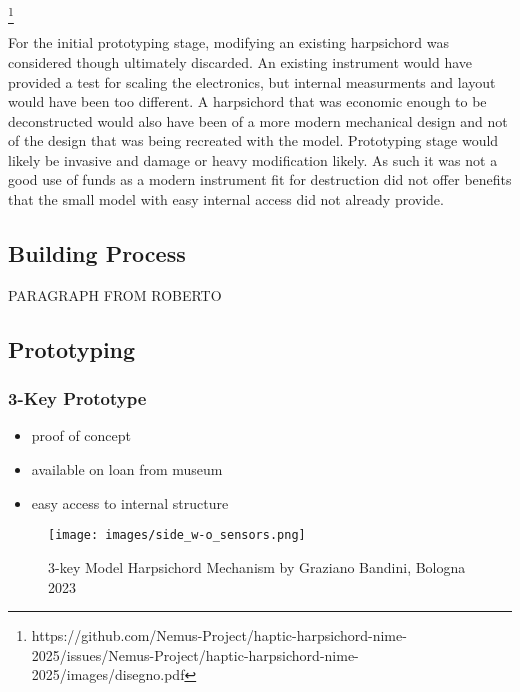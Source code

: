 \footnote{https://github.com/Nemus-Project/haptic-harpsichord-nime-2025/issues/Nemus-Project/haptic-harpsichord-nime-2025/images/disegno.pdf}

For the initial prototyping stage, modifying an existing harpsichord was
considered though ultimately discarded. An existing instrument would
have provided a test for scaling the electronics, but internal
measurments and layout would have been too different. A harpsichord that
was economic enough to be deconstructed would also have been of a more
modern mechanical design and not of the design that was being recreated
with the model. Prototyping stage would likely be invasive and damage or
heavy modification likely. As such it was not a good use of funds as a
modern instrument fit for destruction did not offer benefits that the
small model with easy internal access did not already provide.

\subsection{Building Process}\label{building-process}

PARAGRAPH FROM ROBERTO

\subsection{Prototyping}\label{prototyping}

\subsubsection{3-Key Prototype}\label{key-prototype}

\begin{itemize}
\item
  proof of concept
\item
  available on loan from museum
\item
  easy access to internal structure
\end{itemize}

\begin{figure}
  \centering
  \texttt{[image: images/side\_w-o\_sensors.png]} 
  \caption{3-key Model Harpsichord Mechanism by Graziano Bandini, Bologna 2023}  
\end{figure}


